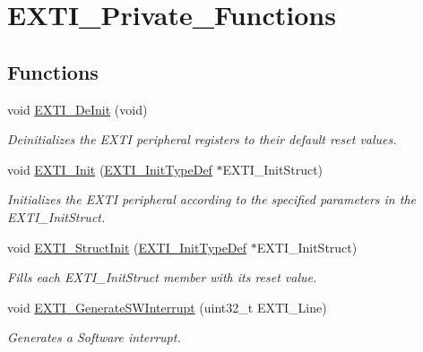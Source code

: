 \hypertarget{group___e_x_t_i___private___functions}{}\section{E\+X\+T\+I\+\_\+\+Private\+\_\+\+Functions}
\label{group___e_x_t_i___private___functions}
\subsection*{Functions}
\begin{DoxyCompactItemize}
\item 
void \mbox{\hyperlink{group___e_x_t_i___private___functions_ga07072e339cb9ecb9cd9d4b94afc9f317}{E\+X\+T\+I\+\_\+\+De\+Init}} (void)
\begin{DoxyCompactList}\small\item\em Deinitializes the E\+X\+TI peripheral registers to their default reset values. \end{DoxyCompactList}\item 
void \mbox{\hyperlink{group___e_x_t_i___private___functions_ga8c9ce6352a3a2dfc8fc9287cb24c6501}{E\+X\+T\+I\+\_\+\+Init}} (\mbox{\hyperlink{struct_e_x_t_i___init_type_def}{E\+X\+T\+I\+\_\+\+Init\+Type\+Def}} $\ast$E\+X\+T\+I\+\_\+\+Init\+Struct)
\begin{DoxyCompactList}\small\item\em Initializes the E\+X\+TI peripheral according to the specified parameters in the E\+X\+T\+I\+\_\+\+Init\+Struct. \end{DoxyCompactList}\item 
void \mbox{\hyperlink{group___e_x_t_i___private___functions_ga86b9e662d18a2f829999cfb26aa7ca20}{E\+X\+T\+I\+\_\+\+Struct\+Init}} (\mbox{\hyperlink{struct_e_x_t_i___init_type_def}{E\+X\+T\+I\+\_\+\+Init\+Type\+Def}} $\ast$E\+X\+T\+I\+\_\+\+Init\+Struct)
\begin{DoxyCompactList}\small\item\em Fills each E\+X\+T\+I\+\_\+\+Init\+Struct member with its reset value. \end{DoxyCompactList}\item 
void \mbox{\hyperlink{group___e_x_t_i___private___functions_ga897e8ea59f40a19e047fb9994876fc9b}{E\+X\+T\+I\+\_\+\+Generate\+S\+W\+Interrupt}} (uint32\+\_\+t E\+X\+T\+I\+\_\+\+Line)
\begin{DoxyCompactList}\small\item\em Generates a Software interrupt. \end{DoxyCompactList}\item 

\end{DoxyCompactItemize}
